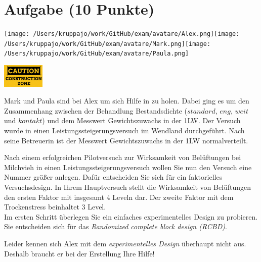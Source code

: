 \documentclass[a4paper, 9pt]{scrartcl}\usepackage[]{graphicx}\usepackage[]{xcolor}
\begin{document}
\section{Aufgabe \hfill (10 Punkte)}


 
\begin{minipage}[t]{0.5\textwidth}
\texttt{[image: /Users/kruppajo/work/GitHub/exam/avatare/Alex.png]}\hspace{-4mm}\texttt{[image: /Users/kruppajo/work/GitHub/exam/avatare/Mark.png]}\hspace{-4mm}\texttt{[image: /Users/kruppajo/work/GitHub/exam/avatare/Paula.png]}
\end{minipage}
\begin{minipage}[t]{0.5\textwidth}
\hfill
\href{https://youtu.be/wJqsNV1hOW8}{\includegraphics[width = 2cm]{img/caution}}
\end{minipage}
\vspace{1ex}



Mark und Paula sind bei Alex um sich Hilfe in \Rlogo zu holen. Dabei ging es um den Zusammenhang zwischen der Behandlung Bestandsdichte ($standard$, $eng$, $weit$ und $kontakt$) und dem Messwert Gewichtszuwachs in der 1LW. Der Versuch wurde in einen Leistungssteigerungsversuch im Wendland durchgeführt. Nach seine Betreuerin ist der Messwert Gewichtszuwachs in der 1LW normalverteilt.

Nach einem erfolgreichen Pilotversuch zur Wirksamkeit von Belüftungen bei Milchvieh in einen Leistungssteigerungsversuch wollen Sie nun den Versuch eine Nummer größer anlegen. Dafür entscheiden Sie sich für ein faktorielles Versuchsdesign. In Ihrem Hauptversuch stellt die Wirksamkeit von Belüftungen den ersten Faktor mit insgesamt 4 Leveln dar. Der zweite Faktor mit dem Trockenstress beinhaltet 3 Level. \\

Im ersten Schritt überlegen Sie ein einfaches experimentelles Design zu probieren. Sie entscheiden sich für das \textit{Randomized complete block design (RCBD)}.

Leider kennen sich Alex mit dem \textit{experimentelles Design} überhaupt nicht aus. Deshalb braucht er bei der Erstellung Ihre Hilfe!
\end{document}
